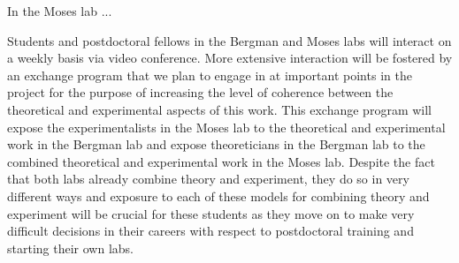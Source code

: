 In the Moses lab ...

Students and postdoctoral fellows in the Bergman and Moses labs will interact on a weekly basis via video conference. More extensive interaction will be fostered by an exchange program that we plan to engage in at important points in the project for the purpose of increasing the level of coherence between the theoretical and experimental aspects of this work. This exchange program will expose the experimentalists in the Moses lab to the theoretical and experimental work in the Bergman lab and expose theoreticians in the Bergman lab to the combined theoretical and experimental work in the Moses lab. Despite the fact that both labs already combine theory and experiment, they do so in very different ways and exposure to each of these models for combining theory and experiment will be crucial for these students as they move on to make very difficult decisions in their careers with respect to postdoctoral training and starting their own labs.